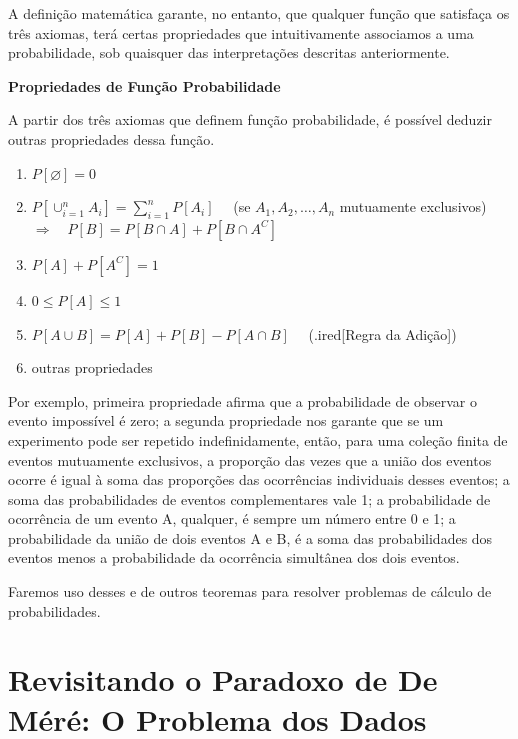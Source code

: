\documentclass[
]{book}
\theoremstyle{definition}
\theoremstyle{definition}
\theoremstyle{definition}
\theoremstyle{remark}
\begin{document}
A definição matemática garante, no entanto, que qualquer função que satisfaça os três axiomas, terá certas propriedades que intuitivamente associamos a uma probabilidade, sob quaisquer das interpretações descritas anteriormente.

\textbf{Propriedades de Função Probabilidade}

A partir dos três axiomas que definem função probabilidade, é possível deduzir outras propriedades dessa função.

\begin{enumerate}
\def\labelenumi{\roman{enumi}.}
\item
  \(P[\varnothing] = 0\)
\item
  \(P\left[\cup_{i=1}^{n}A_i\right] = \sum_{i=1}^{n} P[A_i]\quad\) (se \(A_1, A_2, \ldots, A_n\) mutuamente exclusivos)\\
  \(\Rightarrow \quad P[B] = P[B\cap A] + P[B\cap A^C]\)
\item
  \(P[A] + P[A^C] = 1\)
\item
  \(0 \leq P[A] \leq 1\)
\item
  \(P[A \cup B] = P[A] + P[B] - P[A \cap B]\quad\) (.ired{[}Regra da Adição{]})
\item
  outras propriedades
\end{enumerate}

Por exemplo, primeira propriedade afirma que a probabilidade de observar o evento impossível é zero; a segunda propriedade nos garante que se um experimento pode ser repetido indefinidamente, então, para uma coleção finita de eventos mutuamente exclusivos, a proporção das vezes que a união dos eventos ocorre é igual à soma das proporções das ocorrências individuais desses eventos; a soma das probabilidades de eventos complementares vale 1; a probabilidade de ocorrência de um evento A, qualquer, é sempre um número entre 0 e 1; a probabilidade da união de dois eventos A e B, é a soma das probabilidades dos eventos menos a probabilidade da ocorrência simultânea dos dois eventos.

Faremos uso desses e de outros teoremas para resolver problemas de cálculo de probabilidades.

\hypertarget{revisitando-o-paradoxo-de-de-muxe9ruxe9-o-problema-dos-dados}{%
\section{Revisitando o Paradoxo de De Méré: O Problema dos Dados}\label{revisitando-o-paradoxo-de-de-muxe9ruxe9-o-problema-dos-dados}}
\end{document}

